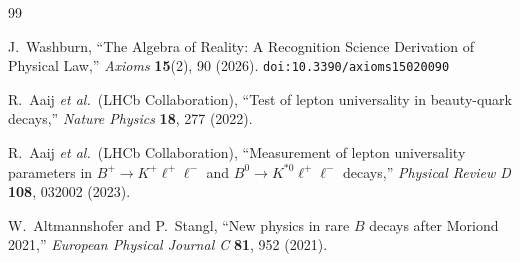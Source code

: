 \documentclass[12pt,a4paper]{article}
\theoremstyle{definition}
\theoremstyle{remark}
\begin{document}
\begin{thebibliography}{99}

J.~Washburn, ``The Algebra of Reality: A Recognition Science Derivation
of Physical Law,'' \emph{Axioms} \textbf{15}(2), 90 (2026).
\texttt{doi:10.3390/axioms15020090}

R.~Aaij \textit{et al.}\ (LHCb Collaboration),
``Test of lepton universality in beauty-quark decays,''
\emph{Nature Physics} \textbf{18}, 277 (2022).

R.~Aaij \textit{et al.}\ (LHCb Collaboration),
``Measurement of lepton universality parameters in $B^+ \to K^+ \ell^+ \ell^-$
and $B^0 \to K^{*0}\ell^+\ell^-$ decays,''
\emph{Physical Review D} \textbf{108}, 032002 (2023).

W.~Altmannshofer and P.~Stangl, ``New physics in rare $B$ decays after
Moriond 2021,'' \emph{European Physical Journal C} \textbf{81}, 952
(2021).

\end{thebibliography}
\end{document}
